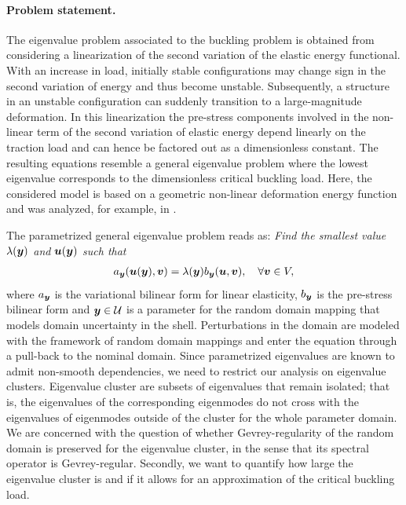 \paragraph{Problem statement.} 
The eigenvalue problem associated to the buckling problem is obtained from considering a 
linearization of the second variation of the elastic energy functional. 
With an increase in load, initially stable configurations may 
change sign in the second variation of energy and thus become unstable. 
Subsequently, a structure in an unstable configuration can suddenly 
transition to a large-magnitude deformation. In this linearization 
the pre-stress components involved in the non-linear term of the second 
variation of elastic energy depend linearly on the traction 
load and can hence be factored out as a dimensionless constant. The 
resulting equations resemble a general eigenvalue problem where 
the lowest eigenvalue corresponds to the dimensionless critical buckling load. 
Here, the considered model is based on a geometric non-linear 
deformation energy function and was analyzed, for example, in 
\cite{DaugeandSuriNumericalapproximation, SZABO199943}.

The parametrized general eigenvalue problem reads as:
\emph{Find the smallest value $\lambda({\boldsymbol{y}}) $ and ${\boldsymbol{u}}({\boldsymbol{y}})$ such that}
\begin{align}\label{eq:bucklingPreview}
    a_{{\boldsymbol{y}}}({\boldsymbol{u}}({\boldsymbol{y}}), {\boldsymbol{v}}) = \lambda({\boldsymbol{y}}) b_{{\boldsymbol{y}}}({\boldsymbol{u}}, {\boldsymbol{v}}) , \quad  \forall {\boldsymbol{v}} \in V,
\end{align}
where $a_{\boldsymbol{y}}$ is the variational bilinear form for linear elasticity, $b_{\boldsymbol{y}}$ is the pre-stress bilinear form and 
${\boldsymbol{y}} \in \mathcal{U}$ is a parameter for the random domain mapping that models domain uncertainty in the shell. 
Perturbations in the domain are modeled with the framework of random domain mappings \cite{Harbrecht2023DomainUncertainty} 
and enter the equation through a pull-back to the nominal domain.
Since parametrized eigenvalues are known to admit non-smooth dependencies, 
we need to restrict our analysis on eigenvalue clusters. 
Eigenvalue cluster are subsets of eigenvalues that remain isolated; that is, 
the eigenvalues of the corresponding eigenmodes do 
not cross with the eigenvalues of eigenmodes outside of the cluster for the whole parameter domain. 
We are concerned with the question of whether Gevrey-regularity of the 
random domain is preserved for the eigenvalue cluster, 
in the sense that its spectral operator is Gevrey-regular. 
Secondly, we want to quantify how large the eigenvalue cluster is 
and if it allows for an approximation of the critical buckling load.
 

